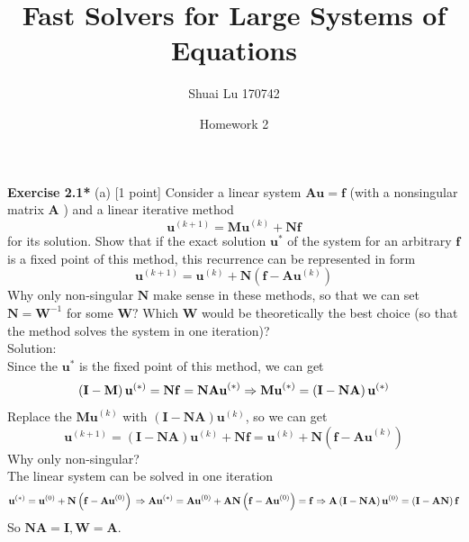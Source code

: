 \documentclass[a4paper]{article}
\title{Fast Solvers for Large Systems of Equations}
\author{Shuai Lu 170742}
\date{Homework 2}
\begin{document}
\maketitle
\noindent \textbf{Exercise 2.1*} (a) [1 point] Consider a linear system $\mathbf{A u}=\mathbf{f}$ (with a nonsingular matrix $\mathbf{A}$ ) and a linear iterative method
$$
\mathbf{u}^{(k+1)}=\mathbf{M u}^{(k)}+\mathbf{N f}
$$
for its solution. Show that if the exact solution $\mathbf{u}^{*}$ of the system for an arbitrary $\mathbf{f}$ is a fixed point of this method, this recurrence can be represented in form
$$
\mathbf{u}^{(k+1)}=\mathbf{u}^{(k)}+\mathbf{N}\left(\mathbf{f}-\mathbf{A} \mathbf{u}^{(k)}\right)
$$
Why only non-singular $\mathbf{N}$ make sense in these methods, so that we can set $\mathbf{N}=\mathbf{W}^{-1}$ for some $\mathbf{W} ?$ Which $\mathbf{W}$ would be theoretically the best choice (so that the method solves the system in one iteration)?\\

\noindent Solution:\\
Since the $\mathbf{u}^{*}$ is the fixed point of this method, we can get\\
$$
\left( \mathbf{I}-\mathbf{M} \right) \mathbf{u}^{\left( * \right)}=\mathbf{Nf}=\mathbf{NAu}^{\left( * \right)}
\\
\Rightarrow \mathbf{Mu}^{\left( * \right)}=\left( \mathbf{I}-\mathbf{NA} \right) \mathbf{u}^{\left( * \right)}
$$
Replace the $\mathbf{Mu}^{\left( k \right)}$ with $\left( \mathbf{I}-\mathbf{NA} \right) \mathbf{u}^{\left( k \right)}$, so we can get\\
$$
\mathbf{u}^{\left( k+1 \right)}=\left( \mathbf{I}-\mathbf{NA} \right) \mathbf{u}^{\left( k \right)}+\mathbf{Nf}=\mathbf{u}^{\left( k \right)}+\mathbf{N}\left( \mathbf{f}-\mathbf{Au}^{\left( k \right)} \right) 
$$
Why only non-singular?\\
The linear system can be solved in one iteration\\
$$
\mathbf{u}^{\left( * \right)}=\mathbf{u}^{\left( 0 \right)}+\mathbf{N}\left( \mathbf{f}-\mathbf{Au}^{\left( 0 \right)} \right) 
\\
\Rightarrow \mathbf{Au}^{\left( * \right)}=\mathbf{Au}^{\left( 0 \right)}+\mathbf{AN}\left( \mathbf{f}-\mathbf{Au}^{\left( 0 \right)} \right) =\mathbf{f}
\\
\Rightarrow \mathbf{A}\left( \mathbf{I}-\mathbf{NA} \right) \mathbf{u}^{\left( 0 \right)}=\left( \mathbf{I}-\mathbf{AN} \right) \mathbf{f}
$$
So $\mathbf{NA}=\mathbf{I}, \mathbf{W}=\mathbf{A}$.\\
\end{document}
